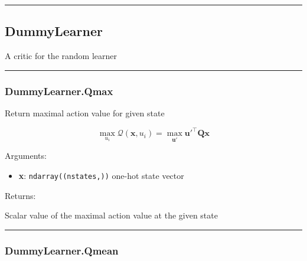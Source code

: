 \begin{center}\rule{0.5\linewidth}{\linethickness}\end{center}

\hypertarget{dummylearner}{%
\subsection{DummyLearner}\label{dummylearner}}

\begin{Shaded}
\begin{Highlighting}[]
\end{Highlighting}
\end{Shaded}

A critic for the random learner

\begin{center}\rule{0.5\linewidth}{\linethickness}\end{center}

\hypertarget{dummylearner.qmax}{%
\subsubsection{DummyLearner.Qmax}\label{dummylearner.qmax}}

\begin{Shaded}
\begin{Highlighting}[]
\end{Highlighting}
\end{Shaded}

Return maximal action value for given state

\[
\max_{u_i}\mathcal Q(\mathbf x, u_i) = \max_{\mathbf u'} \mathbf u'^\top \mathbf Q \mathbf x
\]

Arguments:

\begin{itemize}
\tightlist
\item
  \textbf{x}: \texttt{ndarray((nstates,))} one-hot state vector
\end{itemize}

Returns:

Scalar value of the maximal action value at the given state

\begin{center}\rule{0.5\linewidth}{\linethickness}\end{center}

\hypertarget{dummylearner.qmean}{%
\subsubsection{DummyLearner.Qmean}\label{dummylearner.qmean}}

